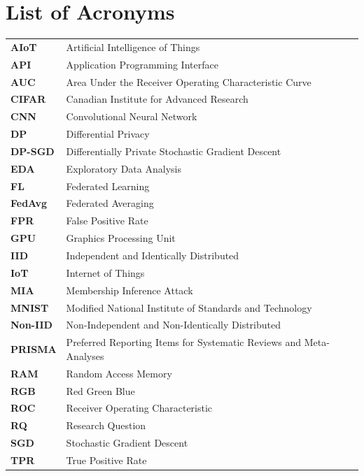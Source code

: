 \documentclass[12pt, a4paper]{report}
\begin{document}
\setcounter{page}{1}
\newpage
\tableofcontents
\newpage

\chapter*{List of Acronyms}
\begin{tabular}{p{3.5cm} p{10cm}}
  \textbf{AIoT}    & Artificial Intelligence of Things \\[4pt]
  \textbf{API}     & Application Programming Interface \\[4pt]
  \textbf{AUC}     & Area Under the Receiver Operating Characteristic Curve \\[4pt]
  \textbf{CIFAR}   & Canadian Institute for Advanced Research \\[4pt]
  \textbf{CNN}     & Convolutional Neural Network \\[4pt]
  \textbf{DP}      & Differential Privacy \\[4pt]
  \textbf{DP-SGD}  & Differentially Private Stochastic Gradient Descent \\[4pt]
  \textbf{EDA}     & Exploratory Data Analysis \\[4pt]
  \textbf{FL}      & Federated Learning \\[4pt]
  \textbf{FedAvg}  & Federated Averaging \\[4pt]
  \textbf{FPR}     & False Positive Rate \\[4pt]
  \textbf{GPU}     & Graphics Processing Unit \\[4pt]
  \textbf{IID}     & Independent and Identically Distributed \\[4pt]
  \textbf{IoT}     & Internet of Things \\[4pt]
  \textbf{MIA}     & Membership Inference Attack \\[4pt]
  \textbf{MNIST}   & Modified National Institute of Standards and Technology \\[4pt]
  \textbf{Non-IID} & Non-Independent and Non-Identically Distributed \\[4pt]
  \textbf{PRISMA}  & Preferred Reporting Items for Systematic Reviews and Meta-Analyses \\[4pt]
  \textbf{RAM}     & Random Access Memory \\[4pt]
  \textbf{RGB}     & Red Green Blue \\[4pt]
  \textbf{ROC}     & Receiver Operating Characteristic \\[4pt]
  \textbf{RQ}      & Research Question \\[4pt]
  \textbf{SGD}     & Stochastic Gradient Descent \\[4pt]
  \textbf{TPR}     & True Positive Rate \\[4pt]
\end{tabular}
\newpage
\end{document}

